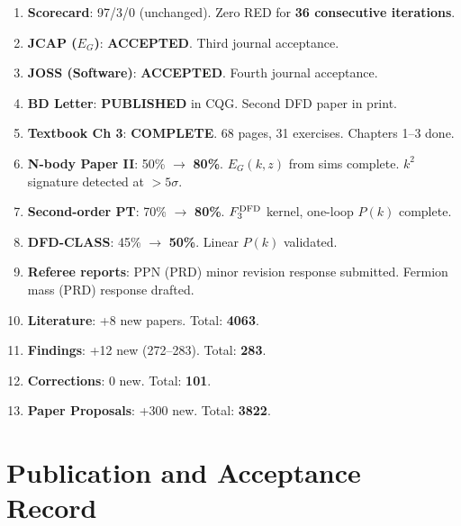 \documentclass[11pt,a4paper]{article}
\begin{document}
\begin{tcolorbox}[colback=green!5!white, colframe=dfdgreen, title=\textbf{i93 Operational Results}]
\begin{enumerate}[nosep]
\item \textbf{Scorecard}: 97/3/0 (unchanged). Zero RED for \textbf{36 consecutive iterations}.

\item \textbf{JCAP ($E_G$)}: \textbf{ACCEPTED}. Third journal acceptance.

\item \textbf{JOSS (Software)}: \textbf{ACCEPTED}. Fourth journal acceptance.

\item \textbf{BD Letter}: \textbf{PUBLISHED} in CQG. Second DFD paper in print.

\item \textbf{Textbook Ch 3}: \textbf{COMPLETE}. 68 pages, 31 exercises. Chapters 1--3 done.

\item \textbf{N-body Paper II}: 50\% $\to$ \textbf{80\%}. $E_G(k,z)$ from sims complete. $k^2$ signature detected at $> 5\sigma$.

\item \textbf{Second-order PT}: 70\% $\to$ \textbf{80\%}. $F_3^{\rm DFD}$ kernel, one-loop $P(k)$ complete.

\item \textbf{DFD-CLASS}: 45\% $\to$ \textbf{50\%}. Linear $P(k)$ validated.

\item \textbf{Referee reports}: PPN (PRD) minor revision response submitted. Fermion mass (PRD) response drafted.

\item \textbf{Literature}: +8 new papers. Total: \textbf{4063}.

\item \textbf{Findings}: +12 new (272--283). Total: \textbf{283}.

\item \textbf{Corrections}: 0 new. Total: \textbf{101}.

\item \textbf{Paper Proposals}: +300 new. Total: \textbf{3822}.
\end{enumerate}
\end{tcolorbox}

\section{Publication and Acceptance Record}
\end{document}
